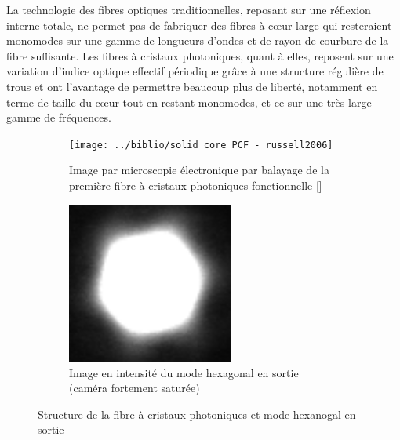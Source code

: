 \documentclass[11pt,a4paper] { article}
\newcommand{\ncite}[1]{[\citenum{#1}]}
\begin{document}
La technologie des fibres optiques traditionnelles, reposant sur une réflexion interne totale, ne permet pas de fabriquer des fibres à c\oe ur large qui resteraient monomodes sur une gamme de longueurs d'ondes et de rayon de courbure de la fibre suffisante. 
Les fibres à cristaux photoniques, quant à elles, reposent sur une variation d'indice optique effectif périodique grâce à une structure régulière de trous et ont l'avantage de permettre beaucoup plus de liberté, notamment en terme de taille du c\oe ur tout en restant monomodes, et ce sur une très large gamme de fréquences.  
\citep{russell2006,russell2007}


\begin{figure}[htpb]  
\centering
\hspace*{0.4cm}
\begin{subfigure}[t]{0.38\textwidth}
	\centering
	\texttt{[image: ../biblio/solid core PCF - russell2006]}
	\caption{Image par microscopie électronique par balayage de la première fibre à cristaux photoniques fonctionnelle \ncite{russell2006}}
	\label{fig:PCF}
\end{subfigure}
\hspace*{0.4cm}
\begin{subfigure}[t]{0.37\textwidth}
	\centering
	\includegraphics[height=5.3cm]{./img/mode hexa.png}
	\caption{Image en intensité du mode hexagonal en sortie (caméra fortement saturée)}
	\label{fig:hexa}
\end{subfigure}
\hspace*{-0.8cm}
\caption{Structure de la fibre à cristaux photoniques et mode hexanogal en sortie}
\end{figure}
\end{document}
